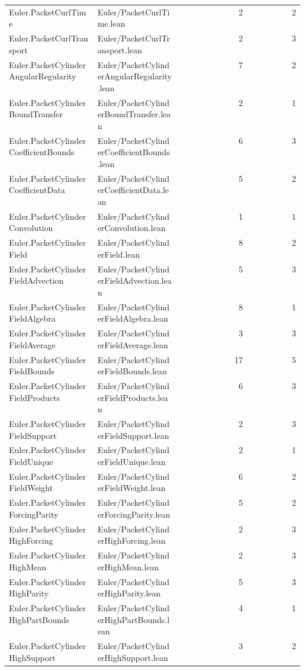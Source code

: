 \begin{longtable}{p{0.30\linewidth}p{0.28\linewidth}rr}
Euler.PacketCurlTime & Euler/PacketCurlTime.lean & 2 & 2\\
Euler.PacketCurlTransport & Euler/PacketCurlTransport.lean & 2 & 3\\
Euler.PacketCylinderAngularRegularity & Euler/PacketCylinderAngularRegularity.lean & 7 & 2\\
Euler.PacketCylinderBoundTransfer & Euler/PacketCylinderBoundTransfer.lean & 2 & 1\\
Euler.PacketCylinderCoefficientBounds & Euler/PacketCylinderCoefficientBounds.lean & 6 & 3\\
Euler.PacketCylinderCoefficientData & Euler/PacketCylinderCoefficientData.lean & 5 & 2\\
Euler.PacketCylinderConvolution & Euler/PacketCylinderConvolution.lean & 1 & 1\\
Euler.PacketCylinderField & Euler/PacketCylinderField.lean & 8 & 2\\
Euler.PacketCylinderFieldAdvection & Euler/PacketCylinderFieldAdvection.lean & 5 & 3\\
Euler.PacketCylinderFieldAlgebra & Euler/PacketCylinderFieldAlgebra.lean & 8 & 1\\
Euler.PacketCylinderFieldAverage & Euler/PacketCylinderFieldAverage.lean & 3 & 3\\
Euler.PacketCylinderFieldBounds & Euler/PacketCylinderFieldBounds.lean & 17 & 5\\
Euler.PacketCylinderFieldProducts & Euler/PacketCylinderFieldProducts.lean & 6 & 3\\
Euler.PacketCylinderFieldSupport & Euler/PacketCylinderFieldSupport.lean & 2 & 3\\
Euler.PacketCylinderFieldUnique & Euler/PacketCylinderFieldUnique.lean & 2 & 1\\
Euler.PacketCylinderFieldWeight & Euler/PacketCylinderFieldWeight.lean & 6 & 2\\
Euler.PacketCylinderForcingParity & Euler/PacketCylinderForcingParity.lean & 5 & 2\\
Euler.PacketCylinderHighForcing & Euler/PacketCylinderHighForcing.lean & 2 & 3\\
Euler.PacketCylinderHighMean & Euler/PacketCylinderHighMean.lean & 2 & 3\\
Euler.PacketCylinderHighParity & Euler/PacketCylinderHighParity.lean & 5 & 3\\
Euler.PacketCylinderHighPartBounds & Euler/PacketCylinderHighPartBounds.lean & 4 & 1\\
Euler.PacketCylinderHighSupport & Euler/PacketCylinderHighSupport.lean & 3 & 2\\

\end{longtable}

